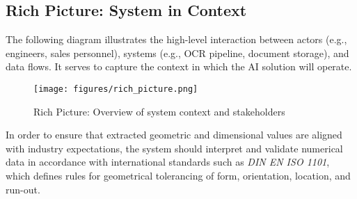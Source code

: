 \documentclass[12pt]{article}
\begin{document}
\subsection*{Rich Picture: System in Context}

The following diagram illustrates the high-level interaction between actors (e.g., engineers, sales personnel), systems (e.g., OCR pipeline, document storage), and data flows. It serves to capture the context in which the AI solution will operate.

\begin{figure}[ht]
    \centering
    \texttt{[image: figures/rich\_picture.png]}
    \caption{Rich Picture: Overview of system context and stakeholders}
    \label{fig:rich_picture}
\end{figure}

\vspace{1em}
\noindent
In order to ensure that extracted geometric and dimensional values are aligned with industry expectations,
the system should interpret and validate numerical data in accordance with international standards such as
\textit{DIN EN ISO 1101}, which defines rules for geometrical tolerancing of form, orientation, location, and run-out.
\end{document}
